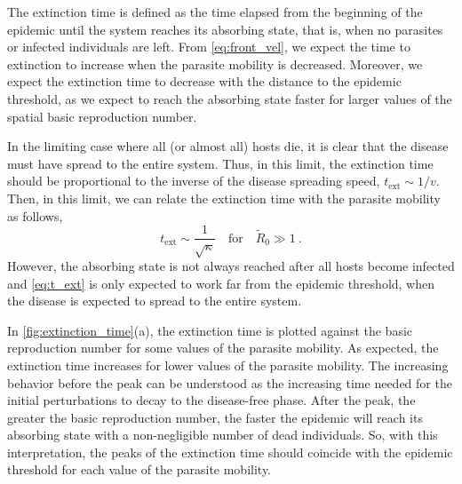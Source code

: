 The extinction time is defined as the time elapsed from the beginning of
the epidemic until the system reaches its absorbing state, that is, when no
parasites or infected individuals are left. From \cref{eq:front_vel}, we expect
the time to extinction to increase when the parasite mobility is decreased.
Moreover, we expect the extinction time to decrease with the distance to the
epidemic threshold, as we expect to reach the absorbing state faster for larger
values of the spatial basic reproduction number.

In the limiting case where all (or almost all) hosts die, it is clear that
the disease must have spread to the entire system. Thus, in this limit, the
extinction time should be proportional to the inverse of the disease spreading
speed, $t_{\textrm{ext}}\sim 1/v$. Then, in this limit, we can relate the
extinction time with the parasite mobility as follows,
\begin{equation}\label{eq:t_ext}
    t_{\textrm{ext}}\sim\frac{1}{\sqrt{\kappa}} \quad \textrm{for} \quad
    \tilde{R}_0\gg1 \ .
\end{equation}
However, the absorbing state is not always reached after all hosts become
infected and \cref{eq:t_ext} is only expected to work far from the epidemic
threshold, when the disease is expected to spread to the entire system.

In \cref{fig:extinction_time}(a), the extinction time is plotted against the
basic reproduction number for some values of the parasite mobility. As
expected, the extinction time increases for lower values of the parasite
mobility. The increasing behavior before the peak can be understood as the
increasing time needed for the initial perturbations to decay to the
disease-free phase. After the peak, the greater the basic reproduction number,
the faster the epidemic will reach its absorbing state with a non-negligible
number of dead individuals. So, with this interpretation, the peaks of the
extinction time should coincide with the epidemic threshold for each value of
the parasite mobility.

